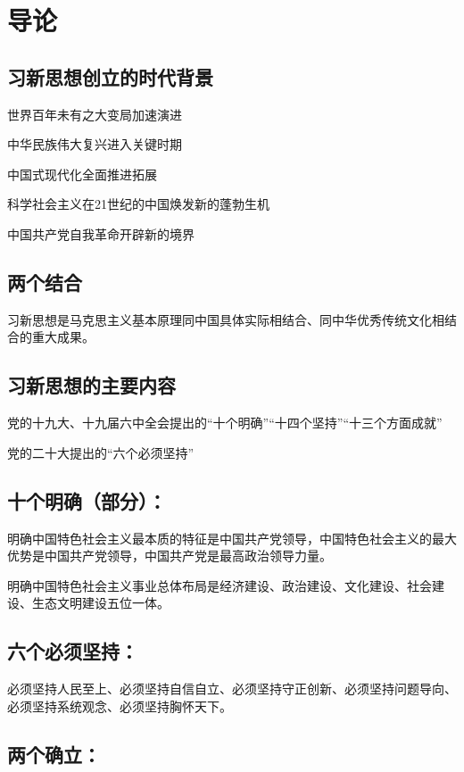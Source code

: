 \documentclass[11pt, a4paper]{article}
\begin{document}
\section*{导论}

\subsection*{习新思想创立的时代背景}

世界百年未有之大变局加速演进

中华民族伟大复兴进入关键时期

中国式现代化全面推进拓展

科学社会主义在21世纪的中国焕发新的蓬勃生机

中国共产党自我革命开辟新的境界

\subsection*{两个结合}

习新思想是马克思主义基本原理同中国具体实际相结合、同中华优秀传统文化相结合的重大成果。

\subsection*{习新思想的主要内容}

党的十九大、十九届六中全会提出的“十个明确”“十四个坚持”“十三个方面成就”

党的二十大提出的“六个必须坚持”

\subsection*{十个明确（部分）：}

明确中国特色社会主义最本质的特征是中国共产党领导，中国特色社会主义的最大优势是中国共产党领导，中国共产党是最高政治领导力量。

明确中国特色社会主义事业总体布局是经济建设、政治建设、文化建设、社会建设、生态文明建设五位一体。

\subsection*{六个必须坚持：}

必须坚持人民至上、必须坚持自信自立、必须坚持守正创新、必须坚持问题导向、必须坚持系统观念、必须坚持胸怀天下。

\subsection*{两个确立：}
\end{document}
